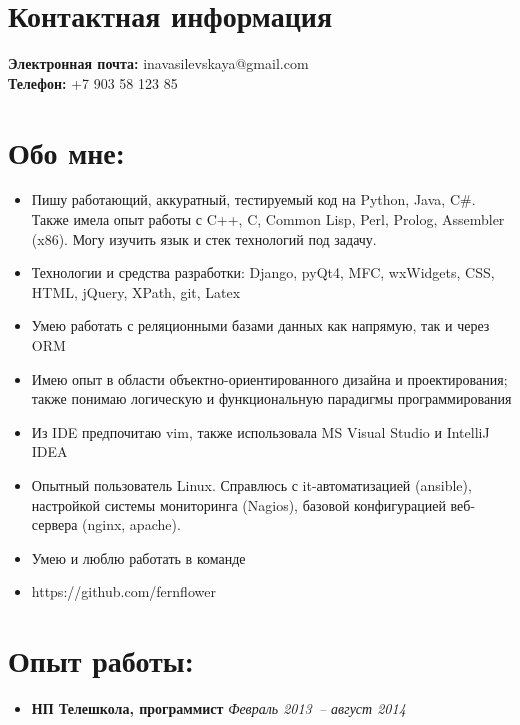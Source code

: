 \documentclass{res}
\begin{document}
    \begin{resume}
        \section{Контактная информация}
        {\bf Электронная почта:} inavasilevskaya@gmail.com \\
        {\bf Телефон:} +7 903 58 123 85\\
        \section{Обо мне:}
        \begin{itemize}
            \item Пишу работающий, аккуратный, тестируемый код на Python, Java, C\#.
              Также имела опыт работы с C++, C, Common Lisp, Perl, Prolog, Assembler (x86). 
              Могу изучить язык и стек технологий под задачу.
              
            \item Технологии и средства разработки: Django, pyQt4, MFC, wxWidgets,
                CSS, HTML, jQuery, XPath, git, Latex 

            \item Умею работать с реляционными базами данных как напрямую, так и через ORM

            \item Имею опыт в области объектно-ориентированного дизайна и проектирования; 
                также понимаю логическую и функциональную парадигмы программирования

            \item Из IDE предпочитаю vim, также использовала MS Visual Studio и IntelliJ IDEA

            \item Опытный пользователь Linux. Справлюсь с it-автоматизацией (ansible), настройкой
                системы мониторинга (Nagios), базовой конфигурацией веб-сервера (nginx, apache).

            \item Умею и люблю работать в команде

            \item https://github.com/fernflower

        \end{itemize}

        \section{Опыт работы:}
        \begin{itemize}
            \item[] \textbf{НП Телешкола, программист} \textit{Февраль 2013~-- август 2014}


\end{itemize}
\end{resume}
\end{document}
